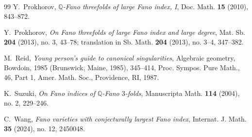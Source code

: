 \documentclass[12pt,twoside]{amsart}
\theoremstyle{definition}
\begin{document}
\begin{thebibliography}{99}
Y.~Prokhorov, 
\emph{$\mathbb Q$-Fano threefolds of large Fano index, I}, 
Doc. Math. \textbf{15} (2010), 843--872.

Y.~Prokhorov, 
\emph{On Fano threefolds of large Fano index and large degree}, 
Mat. Sb. \textbf{204} (2013), no. 3, 43--78; translation in Sb. Math. \textbf{204} (2013), no. 3--4, 347--382.

M.~Reid, 
\emph{Young person's guide to canonical singularities}, 
Algebraic geometry, Bowdoin, 1985 (Brunswick, Maine, 1985), 345--414,
Proc. Sympos. Pure Math., 46, Part 1, Amer. Math. Soc., Providence, RI, 1987.

K.~Suzuki,
\emph{On Fano indices of $\mathbb Q$-Fano $3$-folds},
Manuscripta Math. \textbf{114} (2004), no. 2, 229--246.
 
C.~Wang,
\emph{Fano varieties with conjecturally largest Fano index},
Internat. J. Math. \textbf{35} (2024), no. 12, 2450048.

\end{thebibliography}
\end{document}
